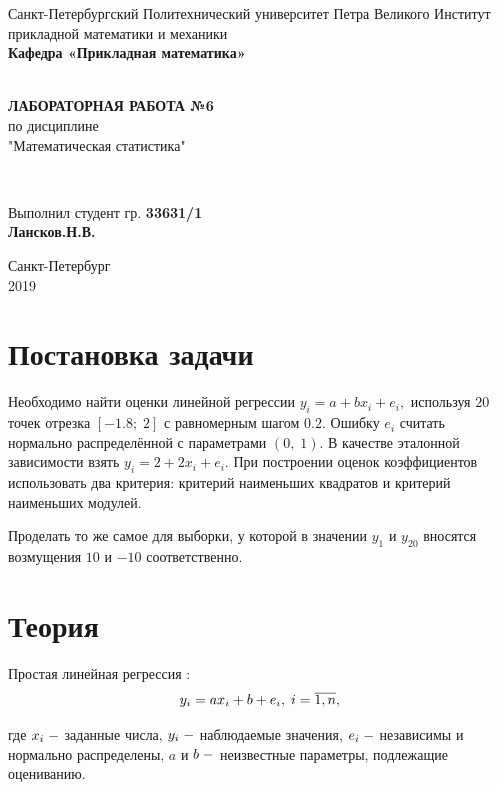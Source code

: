 \documentclass[12pt]{article}
\begin{document}
\begin{titlepage}
	\center
		Санкт-Петербургский Политехнический 
		университет Петра Великого
		Институт прикладной математики и механики
		\\ \textbf{Кафедра «Прикладная математика»}

	\vfill ~
	\textbf{
		\\ \large ЛАБОРАТОРНАЯ РАБОТА №6
	}
	\\	по дисциплине 
	\\	"Математическая статистика"

	\vfill ~

	Выполнил студент гр. \textbf{33631/1} \\
	\textbf{Лансков.Н.В.} \\ 

\vfill

{\large}	Санкт-Петербург
\\ 2019
\end{titlepage}

\tableofcontents
\newpage
\listoffigures
\newpage
\listoftables
\newpage
\pagebreak


\section{Постановка задачи}

Необходимо найти оценки линейной регрессии $y_i=a+bx_i+e_i,$ используя $20$ точек отрезка $[-1.8;\;2]$ с равномерным шагом $0.2.$ Ошибку $e_i$ считать нормально распределённой с параметрами $(0,\;1).$ В качестве эталонной зависимости взять $y_i=2+2x_i+e_i.$ При построении оценок коэффициентов использовать два критерия: критерий наименьших квадратов и критерий наименьших модулей.

Проделать то же самое для выборки, у которой в значении $y_1$ и $y_{20}$ вносятся возмущения $10$ и $-10$ соответственно.

\section{Теория}

Простая линейная регрессия \cite{lin_reg}:
\begin{equation}
    y_i=ax_i+b+e_i,\;i=\overline{1,n},\hfill
\end{equation}

где $x_i\;\--$ заданные числа, $y_i\;\--$ наблюдаемые значения, $e_i\;\--$ независимы и нормально распределены, $a$ и $b\;\--$ неизвестные параметры, подлежащие оцениванию.
\end{document}
